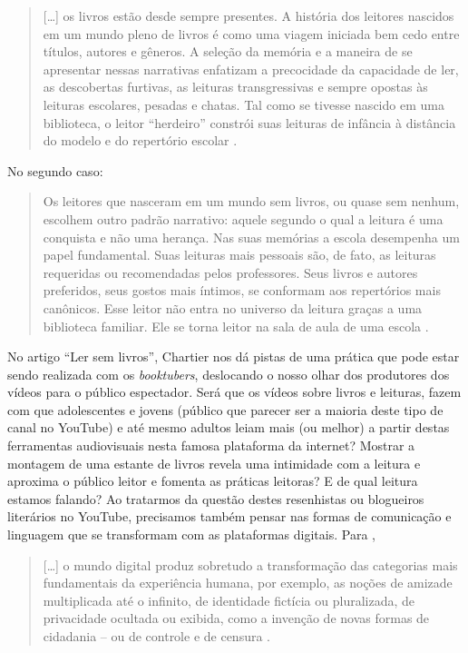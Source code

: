 \begin{quote}
[\ldots] os livros estão desde sempre presentes. A história dos
leitores nascidos em um mundo pleno de livros é como uma viagem iniciada
bem cedo entre títulos, autores e gêneros. A seleção da memória e a
maneira de se apresentar nessas narrativas enfatizam a precocidade da
capacidade de ler, as descobertas furtivas, as leituras transgressivas e
sempre opostas às leituras escolares, pesadas e chatas. Tal como se
tivesse nascido em uma biblioteca, o leitor \enquote{herdeiro} constrói suas
leituras de infância à distância do modelo e do repertório escolar
\cite[p. 7–8]{chartier2019lersem}.
\end{quote}

No segundo caso:

\begin{quote}
Os leitores que nasceram em um mundo sem livros, ou quase sem nenhum,
escolhem outro padrão narrativo: aquele segundo o qual a leitura é uma
conquista e não uma herança. Nas suas memórias a escola desempenha um
papel fundamental. Suas leituras mais pessoais são, de fato, as leituras
requeridas ou recomendadas pelos professores. Seus livros e autores
preferidos, seus gostos mais íntimos, se conformam aos repertórios mais
canônicos. Esse leitor não entra no universo da leitura graças a uma
biblioteca familiar. Ele se torna leitor na sala de aula de uma escola
\cite[p. 8]{chartier2019lersem}.
\end{quote}

No artigo \enquote{Ler sem livros}, Chartier nos dá pistas de uma prática que
pode estar sendo realizada com os \textit{booktubers}, deslocando o nosso
olhar dos produtores dos vídeos para o público espectador. Será que os
vídeos sobre livros e leituras, fazem com que adolescentes e jovens
(público que parecer ser a maioria deste tipo de canal no YouTube) e até
mesmo adultos leiam mais (ou melhor) a partir destas ferramentas
audiovisuais nesta famosa plataforma da internet? Mostrar a montagem de
uma estante de livros revela uma intimidade com a leitura e aproxima o
público leitor e fomenta as práticas leitoras? E de qual leitura estamos
falando? Ao tratarmos da questão destes resenhistas ou blogueiros
literários no YouTube, precisamos também pensar nas formas de
comunicação e linguagem que se transformam com as plataformas digitais.
Para \textcite{chartier2019lersem},

\begin{quote}
[\ldots] o mundo digital produz sobretudo a transformação das
categorias mais fundamentais da experiência humana, por exemplo, as
noções de amizade multiplicada até o infinito, de identidade fictícia ou
pluralizada, de privacidade ocultada ou exibida, como a invenção de
novas formas de cidadania -- ou de controle e de censura \cite[p. 15]{chartier2019lersem}.
\end{quote}

